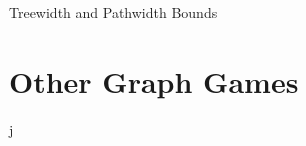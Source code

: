 \documentclass{beamer}
\begin{document}

\begin{frame}{\secname}{Treewidth and Pathwidth Bounds}
    
\end{frame}


\section{Other Graph Games}


\begin{frame}{\secname}
    j
\end{frame}
\end{document}

